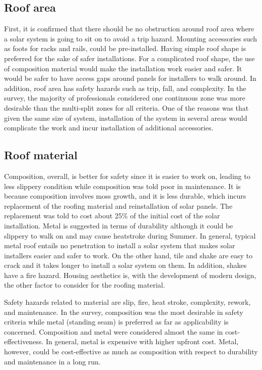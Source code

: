 \documentclass[]{article}
\begin{document}
\hypertarget{roof-area}{%
\subsection{Roof area}\label{roof-area}}

First, it is confirmed that there should be no obstruction around roof
area where a solar system is going to sit on to avoid a trip hazard.
Mounting accessories such as foots for racks and rails, could be
pre-installed. Having simple roof shape is preferred for the sake of
safer installations. For a complicated roof shape, the use of
composition material would make the installation work easier and safer.
It would be safer to have access gaps around panels for installers to
walk around. In addition, roof area has safety hazards such as trip,
fall, and complexity. In the survey, the majority of professionals
considered one continuous zone was more desirable than the multi-split
zones for all criteria. One of the reasons was that given the same size
of system, installation of the system in several areas would complicate
the work and incur installation of additional accessories.

\hypertarget{roof-material}{%
\subsection{Roof material}\label{roof-material}}

Composition, overall, is better for safety since it is easier to work
on, leading to less slippery condition while composition was told poor
in maintenance. It is because composition involves moss growth, and it
is less durable, which incurs replacement of the roofing material and
reinstallation of solar panels. The replacement was told to cost about
25\% of the initial cost of the solar installation. Metal is suggested
in terms of durability although it could be slippery to walk on and may
cause heatstroke during Summer. In general, typical metal roof entails
no penetration to install a solar system that makes solar installers
easier and safer to work. On the other hand, tile and shake are easy to
crack and it takes longer to install a solar system on them. In
addition, shakes have a fire hazard. Housing aesthetics is, with the
development of modern design, the other factor to consider for the
roofing material.

Safety hazards related to material are slip, fire, heat stroke,
complexity, rework, and maintenance. In the survey, composition was the
most desirable in safety criteria while metal (standing seam) is
preferred as far as applicability is concerned. Composition and metal
were considered almost the same in cost-effectiveness. In general, metal
is expensive with higher upfront cost. Metal, however, could be
cost-effective as much as composition with respect to durability and
maintenance in a long run.
\end{document}
